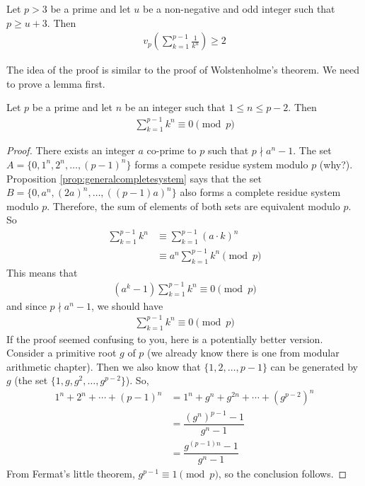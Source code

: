 \documentclass{subfile}
\begin{document}
	\begin{theorem}
		Let $p>3$ be a prime and let $u$ be a non-negative and odd integer such that $p \geq u+3$. Then
		\begin{align*}
		v_{p}\left(\sum_{k = 1}^{p - 1}\frac {1}{k^{u}}\right)\geq 2
		\end{align*}
	\end{theorem}

	The idea of the proof is similar to the proof of Wolstenholme's theorem. We need to prove a lemma first.

	\begin{lemma}\label{lem:darijwolstproof}
		Let $p$ be a prime and let $n$ be an integer such that $1 \leq n \leq p-2$. Then
		\begin{align*}
			\sum_{k = 1}^{p - 1} k^n \equiv 0 \pmod p
		\end{align*}
	\end{lemma}

	\begin{proof}
		There exists an integer $a$ co-prime to $p$ such that $p \nmid a^n -1$. The set $A= \{0, 1^n, 2^n, \ldots, (p-1)^n\}$ forms a compete residue system modulo $p$ (why?). Proposition \eqref{prop:generalcompletesystem} says that the set $B=\{0, a^n, (2a)^n, \ldots, ((p-1)a)^n\}$ also forms a complete residue system modulo $p$. Therefore, the sum of elements of both sets are equivalent modulo $p$. So
		\begin{align*}
			\sum_{k = 1}^{p - 1} k^n
				& \equiv \sum_{k = 1}^{p - 1} (a \cdot k)^n\\
				& \equiv a^n \sum_{k = 1}^{p - 1} k^n \pmod p
		\end{align*}
		This means that
			\begin{align*}
				\left(a^k - 1\right) \sum_{k = 1}^{p - 1} k^n \equiv 0 \pmod p
			\end{align*}
		and since $p \nmid a^n -1$, we should have
			\begin{align*}
				\sum_{k = 1}^{p - 1} k^n \equiv 0 \pmod p
			\end{align*}
		If the proof seemed confusing to you, here is a potentially better version. Consider a primitive root $g$ of $p$ (we already know there is one from modular arithmetic chapter). Then we also know that $\{1,2,\ldots,p-1\}$ can be generated by $g$ (the set $\{1,g,g^2,\ldots,g^{p-2}\}$). So,
			\begin{align*}
				1^n+2^n+\cdots+(p-1)^n
					& = 1^n+g^n+g^{2n}+\cdots+\left(g^{p-2}\right)^n\\
					& = \dfrac{(g^n)^{p-1}-1}{g^n-1}\\
					& = \dfrac{g^{(p-1)n}-1}{g^n-1}
			\end{align*}
		From Fermat's little theorem, $g^{p-1}\equiv1\pmod p$, so the conclusion follows.
	\end{proof}
\end{document}

